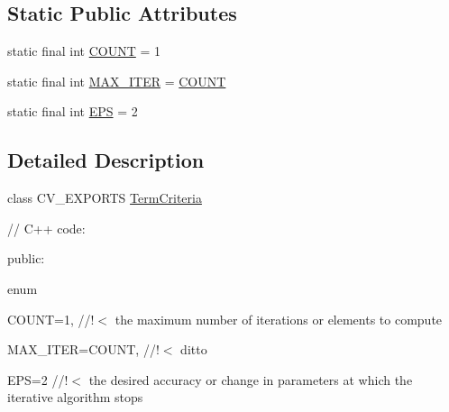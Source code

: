 \subsection*{Static Public Attributes}
\begin{DoxyCompactItemize}
\item 
static final int \mbox{\hyperlink{classorg_1_1opencv_1_1core_1_1_term_criteria_a0f76277287df20de243f9e6102a8ebd3}{C\+O\+U\+NT}} = 1
\item 
static final int \mbox{\hyperlink{classorg_1_1opencv_1_1core_1_1_term_criteria_ad378dbfc8700c3c967e3cb01b503d0db}{M\+A\+X\+\_\+\+I\+T\+ER}} = \mbox{\hyperlink{classorg_1_1opencv_1_1core_1_1_term_criteria_a0f76277287df20de243f9e6102a8ebd3}{C\+O\+U\+NT}}
\item 
static final int \mbox{\hyperlink{classorg_1_1opencv_1_1core_1_1_term_criteria_a111f1613d13f414f4cde48e2ce866367}{E\+PS}} = 2
\end{DoxyCompactItemize}


\subsection{Detailed Description}
class C\+V\+\_\+\+E\+X\+P\+O\+R\+TS \mbox{\hyperlink{classorg_1_1opencv_1_1core_1_1_term_criteria}{Term\+Criteria}} {\ttfamily }

{\ttfamily }

{\ttfamily }

{\ttfamily // C++ code\+:}

{\ttfamily }

{\ttfamily }

{\ttfamily public\+:}

{\ttfamily }

{\ttfamily }

{\ttfamily enum}

{\ttfamily }

{\ttfamily }

{\ttfamily C\+O\+U\+NT=1, //!$<$ the maximum number of iterations or elements to compute}

{\ttfamily }

{\ttfamily }

{\ttfamily M\+A\+X\+\_\+\+I\+T\+ER=C\+O\+U\+NT, //!$<$ ditto}

{\ttfamily }

{\ttfamily }

{\ttfamily E\+PS=2 //!$<$ the desired accuracy or change in parameters at which the iterative algorithm stops}

